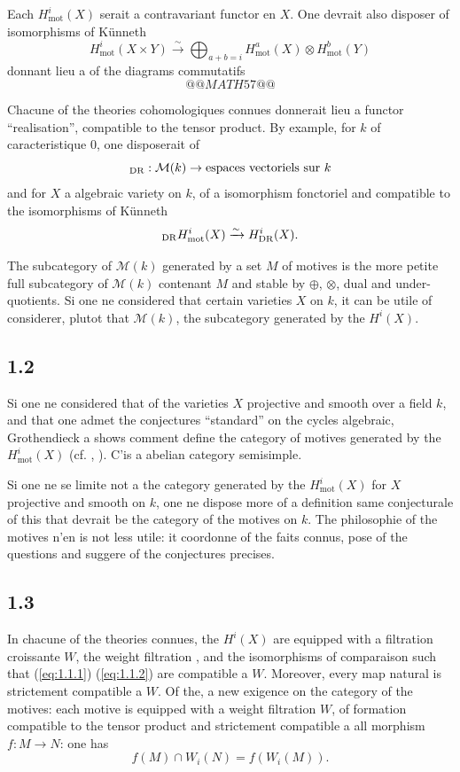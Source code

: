 \documentclass[12pt,a4paper]{article}
\theoremstyle{plain}
\theoremstyle{definition}
\theoremstyle{remark}
\newcommand{\mot}{\mathrm{mot}}
\providecommand{\mot}{\mathrm{mot}}
\providecommand{\DR}{\mathrm{DR}}
\begin{document}
Each $H^i_\mot(X)$ serait a contravariant functor en $X$. One devrait also disposer
of isomorphisms of K\"unneth
\begin{equation}\label{eq:1.1.5}
H^i_\mot(X \times Y) \xrightarrow{\sim} \bigoplus_{a+b=i} H^a_\mot(X) \otimes H^b_\mot(Y)
\end{equation}
donnant lieu a of the diagrams commutatifs
\[
@@MATH57@@
\]

Chacune of the theories cohomologiques connues donnerait lieu a functor
``realisation'', compatible to the tensor product. By example, for $k$ of
caracteristique $0$, one disposerait of
\[
\real_{\DR}: \mathcal{M}(k) \to \text{espaces vectoriels sur } k
\]
and for $X$ a algebraic variety on $k$, of a isomorphism fonctoriel and
compatible to the isomorphisms of K\"unneth
\[
\real_{\DR} H^i_\mot(X) \xrightarrow{\sim} H^i_{\DR}(X).
\]

The subcategory of $\mathcal{M}(k)$ generated by a set $M$ of motives is the
more petite full subcategory of $\mathcal{M}(k)$ contenant $M$ and stable by $\oplus$,
$\otimes$, dual and under-quotients. Si one ne considered that certain varieties $X$ on
$k$, it can be utile of considerer, plutot that $\mathcal{M}(k)$, the subcategory
generated by the $H^i(X)$.

\subsection*{1.2}

Si one ne considered that of the varieties $X$ projective and smooth over a field $k$, and
that one admet the conjectures ``standard'' on the cycles algebraic, Grothendieck a
shows comment define the category of motives generated by the
$H^i_\mot(X)$ (cf. \cite{Kl}, \cite{Man}). C'is a abelian category semisimple.

Si one ne se limite not a the category generated by the $H^i_\mot(X)$ for $X$
projective and smooth on $k$, one ne dispose more of a definition same conjecturale of
this that devrait be the category of the motives on $k$. The philosophie of the motives n'en is
not less utile: it coordonne of the faits connus, pose of the questions and suggere of the
conjectures precises.

\subsection*{1.3}

In chacune of the theories connues, the $H^i(X)$ are equipped with a filtration croissante
$W$, the weight filtration \cite{D5}, and the isomorphisms of comparaison such that
(\ref{eq:1.1.1}) (\ref{eq:1.1.2}) are compatible a $W$. Moreover, every map
natural is strictement compatible a $W$. Of the, a new exigence on the
category of the motives: each motive is equipped with a weight filtration $W$, of
formation compatible to the tensor product and strictement compatible a all morphism
$f: M \to N$: one has
\[
f(M) \cap W_i(N) = f(W_i(M)).
\]
\end{document}
